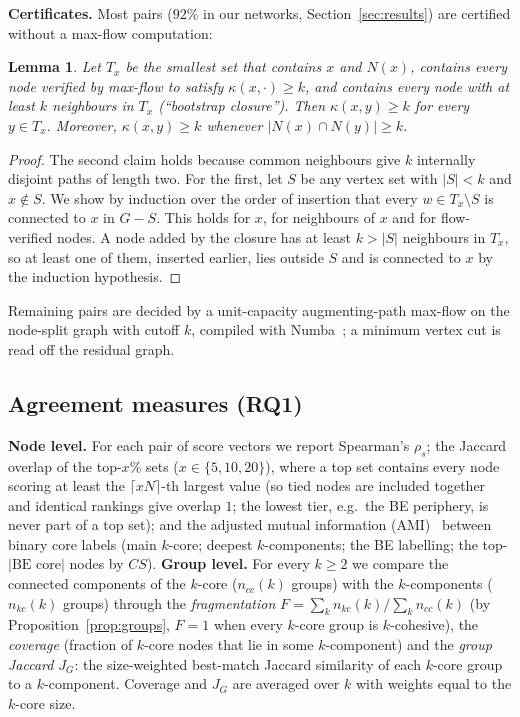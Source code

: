 \documentclass[conference]{IEEEtran}
\newtheorem{lemma}{Lemma}
\begin{document}
\textbf{Certificates.} Most pairs ($92\%$ in our networks, Section~\ref{sec:results}) are certified
without a max-flow computation:
\begin{lemma}\label{lem:cert}
Let $T_x$ be the smallest set that contains $x$ and $N(x)$, contains every node verified by max-flow
to satisfy $\kappa(x,\cdot)\ge k$, and contains every node with at least $k$ neighbours in $T_x$
(``bootstrap closure''). Then $\kappa(x,y)\ge k$ for every $y\in T_x$. Moreover, $\kappa(x,y)\ge k$
whenever $|N(x)\cap N(y)|\ge k$.
\end{lemma}
\begin{proof}
The second claim holds because common neighbours give $k$ internally disjoint paths of length two. For
the first, let $S$ be any vertex set with $|S|<k$ and $x\notin S$. We show by induction over the order
of insertion that every $w\in T_x\setminus S$ is connected to $x$ in $G-S$. This holds for $x$, for
neighbours of $x$ and for flow-verified nodes. A node added by the closure has at least $k>|S|$
neighbours in $T_x$, so at least one of them, inserted earlier, lies outside $S$ and is connected to $x$
by the induction hypothesis.
\end{proof}
Remaining pairs are decided by a unit-capacity augmenting-path max-flow on the node-split graph with
cutoff $k$, compiled with Numba~\cite{lam2015numba}; a minimum vertex cut is read off the residual graph.

\subsection{Agreement measures (RQ1)}
\textbf{Node level.} For each pair of score vectors we report Spearman's $\rho_s$; the Jaccard overlap
of the top-$x\%$ sets ($x\in\{5,10,20\}$), where a top set contains every node scoring at least the
$\lceil xN\rceil$-th largest value (so tied nodes are included together and identical rankings give
overlap $1$; the lowest tier, e.g.\ the BE periphery, is never part of a top set); and the adjusted mutual information
(AMI)~\cite{vinh2010information} between binary core labels (main $k$-core; deepest $k$-components; the BE
labelling; the top-$|\text{BE core}|$ nodes by $CS$).
\textbf{Group level.} For every $k\ge2$ we compare the connected components of the $k$-core
($n_{cc}(k)$ groups) with the $k$-components ($n_{kc}(k)$ groups) through the \emph{fragmentation}
$F=\sum_k n_{kc}(k)/\sum_k n_{cc}(k)$ (by Proposition~\ref{prop:groups}, $F=1$ when every $k$-core group
is $k$-cohesive), the \emph{coverage} (fraction of $k$-core nodes that lie in some $k$-component) and the
\emph{group Jaccard} $J_G$: the size-weighted best-match Jaccard similarity of each $k$-core group to a
$k$-component. Coverage and $J_G$ are averaged over $k$ with weights equal to the $k$-core size.
\end{document}
